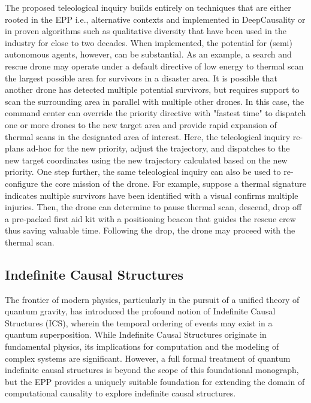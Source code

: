 The proposed teleological inquiry builds entirely on techniques that are either rooted in the EPP i.e., alternative contexts and implemented in DeepCausality or in proven algorithms such as qualitative diversity that have been used in the industry for close to two decades. When implemented, the potential for (semi) autonomous agents, however, can be substantial. As an example, a search and rescue drone may operate under a default directive of low energy to thermal scan the largest possible area for survivors in a disaster area. It is possible that another drone has detected multiple potential survivors, but requires support to scan the surrounding area in parallel with multiple other drones. In this case, the command center can override the priority directive with "fastest time" to dispatch one or more drones to the new target area and provide rapid expansion of thermal scans in the designated area of interest. Here, the teleological inquiry re-plans ad-hoc for the new priority, adjust the trajectory, and dispatches to the new target coordinates using the new trajectory calculated based on the new priority. One step further, the same teleological inquiry can also be used to re-configure the core mission of the drone. For example, suppose a thermal signature indicates multiple survivors have been identified with a visual confirms multiple injuries. Then, the drone can determine to pause thermal scan, descend, drop off a pre-packed first aid kit with a positioning beacon that guides the rescue crew thus saving valuable time. Following the drop, the drone may proceed with the thermal scan.  
  

\subsection{Indefinite Causal Structures}

The frontier of modern physics, particularly in the pursuit of a unified theory of quantum gravity, has introduced the profound notion of Indefinite Causal Structures (ICS), wherein the temporal ordering of events may exist in a quantum superposition. While Indefinite Causal Structures originate in fundamental physics, its implications for computation and the modeling of complex systems are significant.  However, a full formal treatment of quantum indefinite causal structures is beyond the scope of this foundational monograph, but the EPP provides a uniquely suitable foundation for extending the domain of computational causality to explore indefinite causal structures.

